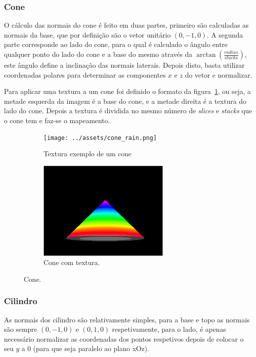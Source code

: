 \documentclass[a4paper]{article}
\begin{document}
\subsubsection{Cone}
O cálculo das normais do cone é feito em duas partes, primeiro são calculadas
as normais da base, que por definição são o vetor unitário $(0,-1,0)$. A
segunda parte corresponde ao lado do cone, para o qual é calculado o ângulo
entre qualquer ponto do lado do cone e a base do mesmo através da
$\arctan(\frac{radius}{stacks})$, este ângulo define a
inclinação das normais laterais. Depois disto, basta utilizar coordenadas
polares para determinar as componentes $x$ e $z$ do vetor e normalizar.

Para aplicar uma textura a um cone foi definido o formato da
figura~\ref{fig:conetexture}, ou seja, a metade esquerda da imagem é a base do
cone, e a metade direita é a textura do lado do cone. Depois a textura é
dividida no mesmo número de \textit{slices} e \textit{stacks} que o cone tem e
faz-se o mapeamento.

\begin{figure}[H]
    \centering
    \begin{subfigure}{0.4\textwidth}
        \centering
        \texttt{[image: ../assets/cone\_rain.png]}
        \caption{Textura exemplo de um cone}
    \end{subfigure}
    \begin{subfigure}{0.4\textwidth}
        \centering
        \includegraphics[width=0.7\textwidth]{cone.png}
        \caption{Cone com textura.}
    \end{subfigure}
    \caption{Cone.}\label{fig:conetexture}
\end{figure}

\subsubsection{Cilindro}
As normais dos cilindro são relativamente simples, para a base e topo as
normais são sempre $(0,-1,0)$ e $(0,1,0)$ respetivamente, para o lado, é apenas
necessário normalizar as coordenadas dos pontos respetivos depois de colocar o
seu $y$ a 0 (para que seja paralelo ao plano xOz).
\end{document}
